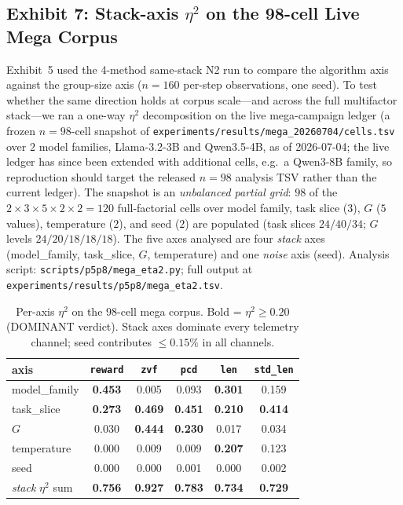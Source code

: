 \documentclass{article}  \usepackage[preprint,nonatbib]{neurips_2026} \usepackage[numbers]{natbib}
\begin{document}
\subsection{Exhibit 7: Stack-axis $\eta^{2}$ on the 98-cell Live Mega Corpus}
\label{sec:p5-exhibit-mega-eta2}
Exhibit~5 used the 4-method same-stack N2 run to compare the algorithm axis
against the group-size axis ($n=160$ per-step observations, one seed). To test
whether the same direction holds at corpus scale---and across the full
multifactor stack---we ran a one-way $\eta^{2}$ decomposition on the live
mega-campaign ledger (a frozen $n=98$-cell snapshot of
\texttt{experiments/results/mega\_20260704/cells.tsv} over $2$ model families,
Llama-3.2-3B and Qwen3.5-4B, as of 2026-07-04; the live ledger has since been
extended with additional cells, e.g.\ a Qwen3-8B family, so reproduction should
target the released $n=98$ analysis TSV rather than the current ledger).
The snapshot is an \emph{unbalanced partial grid}: $98$ of the
$2 \times 3 \times 5 \times 2 \times 2 = 120$ full-factorial cells over model
family, task slice ($3$), $G$ ($5$ values), temperature ($2$), and seed ($2$)
are populated (task slices $24/40/34$; $G$ levels $24/20/18/18/18$). The five axes analysed are
four \emph{stack} axes (model\_family, task\_slice, $G$, temperature) and one
\emph{noise} axis (seed). Analysis script:
\texttt{scripts/p5p8/mega\_eta2.py}; full output at
\texttt{experiments/results/p5p8/mega\_eta2.tsv}.

\begin{table}[t]
\centering
\caption{Per-axis $\eta^{2}$ on the 98-cell mega corpus. Bold = $\eta^{2}
\ge 0.20$ (DOMINANT verdict). Stack axes dominate every telemetry channel;
seed contributes $\le 0.15\%$ in all channels.}
\label{tab:p5-mega-eta2}
\small
\begin{tabular}{@{}lccccc@{}}
\toprule
axis & \texttt{reward} & \texttt{zvf} & \texttt{pcd} & \texttt{len} & \texttt{std\_len} \\
\midrule
model\_family  & \textbf{0.453} & 0.005 & 0.093 & \textbf{0.301} & 0.159 \\
task\_slice    & \textbf{0.273} & \textbf{0.469} & \textbf{0.451} & \textbf{0.210} & \textbf{0.414} \\
$G$            & 0.030          & \textbf{0.444} & \textbf{0.230} & 0.017 & 0.034 \\
temperature    & 0.000          & 0.009 & 0.009 & \textbf{0.207} & 0.123 \\
seed           & 0.000          & 0.000 & 0.001 & 0.000 & 0.002 \\
\midrule
\emph{stack} $\eta^{2}$ sum & \textbf{0.756} & \textbf{0.927} & \textbf{0.783} & \textbf{0.734} & \textbf{0.729} \\
\bottomrule
\end{tabular}
\end{table}
\end{document}
